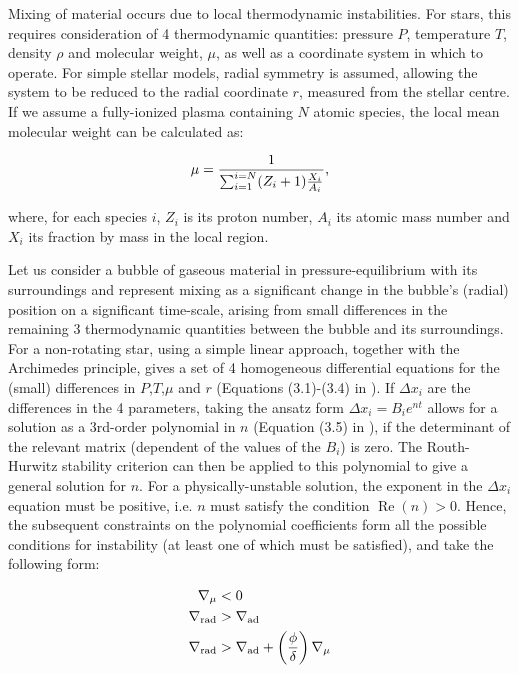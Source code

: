 \documentclass[12pt, a4paper]{report}
\begin{document}
Mixing of material occurs due to local thermodynamic instabilities. For stars, this requires consideration of 4 thermodynamic quantities: pressure $P$, temperature $T$, density $\rho$ and molecular weight, $\mu$, as well as a coordinate system in which to operate. For simple stellar models, radial symmetry is assumed, allowing the system to be reduced to the radial coordinate $r$, measured from the stellar centre. If we assume a fully-ionized plasma containing $N$ atomic species, the local mean molecular weight can be calculated as:

\begin{equation}
\mu = \frac{1}{\sum_{i=1}^{i=N} (Z_{i}+1) \frac{X_{i}}{A_{i}}} \textnormal{,}
\label{mol_weight_def}
\end{equation}

where, for each species $i$, $Z_{i}$ is its proton number, $A_{i}$ its atomic mass number and $X_{i}$ its fraction by mass in the local region.

Let us consider a bubble of gaseous material in pressure-equilibrium with its surroundings and represent mixing as a significant change in the bubble's (radial) position on a significant time-scale, arising from small differences in the remaining 3 thermodynamic quantities between the bubble and its surroundings. For a non-rotating star, using a simple linear approach, together with the Archimedes principle, gives a set of 4 homogeneous differential equations for the (small) differences in $P$,$T$,$\mu$ and $r$ (Equations (3.1)-(3.4) in \cite{2017RSOS....470192S}). If $\Delta x_{i}$ are the differences in the 4 parameters, taking the ansatz form $\Delta x_{i} = B_{i} e^{nt}$ allows for a solution as a 3rd-order polynomial in $n$ (Equation (3.5) in \cite{2017RSOS....470192S}), if the determinant of the relevant matrix (dependent of the values of the $B_{i}$) is zero. The Routh-Hurwitz stability criterion can then be applied to this polynomial to give a general solution for $n$. For a physically-unstable solution, the exponent in the $\Delta x_{i}$ equation must be positive, i.e. $n$ must satisfy the condition $\operatorname{Re}(n) > 0$. Hence, the subsequent constraints on the polynomial coefficients form all the possible conditions for instability (at least one of which must be satisfied), and take the following form:

\begin{align}
\nabla _{\mu} &< 0 \label{mu_inv_ineq} \\
\nabla _{\textnormal{rad}} &> \nabla _{\textnormal{ad}} \label{schwarz_ineq} \\
\nabla _{\textnormal{rad}} &> \nabla _{\textnormal{ad}} + \left( \frac{\phi}{\delta} \right) \nabla _{\mu} \label{ledoux_ineq}
\end{align}
\end{document}
